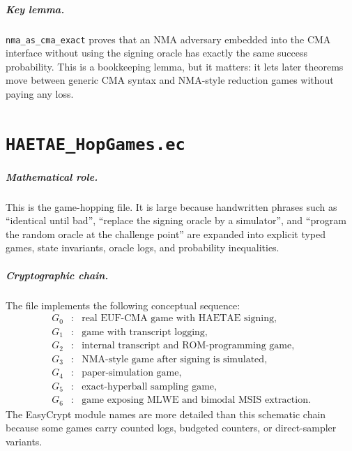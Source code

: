 \documentclass[11pt]{report}
\newcommand{\ec}[1]{\nolinkurl{#1}}
\newcommand{\ecchapter}[2]{\chapter{\texorpdfstring{\texttt{#1}}{#2}}}
\theoremstyle{definition}
\theoremstyle{plain}
\theoremstyle{definition}
\begin{document}
\paragraph{Key lemma.}
\ec{nma_as_cma_exact} proves that an NMA adversary embedded into the CMA
interface without using the signing oracle has exactly the same success
probability.  This is a bookkeeping lemma, but it matters: it lets later
theorems move between generic CMA syntax and NMA-style reduction games without
paying any loss.



\ecchapter{HAETAE\_HopGames.ec}{HAETAE HopGames.ec}

\paragraph{Mathematical role.}
This is the game-hopping file.  It is large because handwritten phrases such as
``identical until bad'', ``replace the signing oracle by a simulator'', and
``program the random oracle at the challenge point'' are expanded into explicit
typed games, state invariants, oracle logs, and probability inequalities.

\paragraph{Cryptographic chain.}
The file implements the following conceptual sequence:
\[
\begin{array}{rcl}
G_0 &:& \text{real EUF-CMA game with HAETAE signing},\\
G_1 &:& \text{game with transcript logging},\\
G_2 &:& \text{internal transcript and ROM-programming game},\\
G_3 &:& \text{NMA-style game after signing is simulated},\\
G_4 &:& \text{paper-simulation game},\\
G_5 &:& \text{exact-hyperball sampling game},\\
G_6 &:& \text{game exposing MLWE and bimodal MSIS extraction}.
\end{array}
\]
The EasyCrypt module names are more detailed than this schematic chain because
some games carry counted logs, budgeted counters, or direct-sampler variants.
\end{document}
